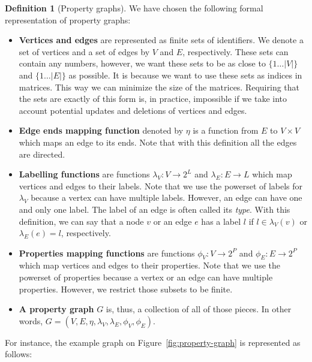 \documentclass[14pt]{constructor-thesis}
\theoremstyle{definition}
\newtheorem{definition}{Definition}
\begin{document}
\begin{definition}[Property graphs]
  We have chosen the following formal representation of property graphs:
  \begin{itemize}
    \item \textbf{Vertices and edges} are represented as finite sets of identifiers. We denote a set of vertices and a set of edges by $V$ and $E$, respectively. These sets can contain any numbers, however, we want these sets to be as close to $\{1 \dots |V|\}$ and $\{1 \dots |E|\}$ as possible. It is because we want to use these sets as indices in matrices. This way we can minimize the size of the matrices. Requiring that the sets are exactly of this form is, in practice, impossible if we take into account potential updates and deletions of vertices and edges.
    \item \textbf{Edge ends mapping function} denoted by $\eta$ is a function from $E$ to $V \times V$ which maps an edge to its ends. Note that with this definition all the edges are directed.
    \item \textbf{Labelling functions} are functions $\lambda_V : V \to 2^L$ and $\lambda_E : E \to L$ which map vertices and edges to their labels. Note that we use the powerset of labels for $\lambda_V$ because a vertex can have multiple labels. However, an edge can have one and only one label. The label of an edge is often called its \textit{type}. With this definition, we can say that a node $v$ or an edge $e$ has a label $l$ if $l \in \lambda_V(v)$ or $\lambda_E(e) = l$, respectively.
    \item \textbf{Properties mapping functions} are functions $\phi_V : V \to 2^P$ and $\phi_E : E \to 2^P$ which map vertices and edges to their properties. Note that we use the powerset of properties because a vertex or an edge can have multiple properties. However, we restrict those subsets to be finite.
    \item \textbf{A property graph} $G$ is, thus, a collection of all of those pieces. In other words, $G = (V, E, \eta, \lambda_V, \lambda_E, \phi_V, \phi_E)$.
  \end{itemize}
\end{definition}

For instance, the example graph on Figure~\ref{fig:property-graph} is represented as follows:
\end{document}

